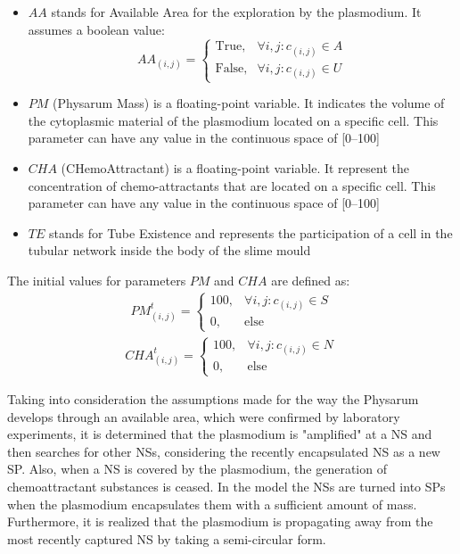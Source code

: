 \begin{itemize}
	\item $AA$ stands for Available Area for the exploration by the plasmodium. It assumes a boolean value:  	
\[AA_{(i, j)}=\begin{cases} \mbox{True}, & \forall i, j: c_{(i,j)} \in A \\ \mbox{False}, &  \forall i, j: c_{(i,j)} \in U\end{cases}\]
	\item $PM$ (Physarum Mass) is a floating-point variable. It indicates the volume of the cytoplasmic material of the plasmodium located on a specific cell. This parameter can have any value in the continuous space of [0–100]
	\item $CHA$ (CHemoAttractant) is a floating-point variable. It represent the concentration of chemo-attractants that are located on a specific cell. This parameter can have any value in the continuous space of [0–100]
	\item $TE$ stands for Tube Existence and represents the participation of a cell in the tubular network inside the body of the slime mould
\end{itemize}

The initial values for parameters $PM$ and $CHA$ are defined as:
\begin{align}
PM^t_{(i, j)}=\begin{cases} 100, & \forall i, j: c_{(i,j)} \in S \\ 0, & \mbox{else}\end{cases}
\end{align}
\begin{align}
CHA^t_{(i, j)}=\begin{cases} 100, & \forall i, j: c_{(i,j)} \in N \\ 0, & \mbox{else}\end{cases}
\end{align}

Taking into consideration the assumptions made for the way the Physarum develops through an available area, which were confirmed by laboratory experiments, it is determined that the plasmodium is "amplified" at a NS and then searches for other NSs, considering the recently encapsulated NS as a new SP. Also, when a NS is covered by the plasmodium, the generation of chemoattractant substances is ceased.
In the model the NSs are turned into SPs when the plasmodium encapsulates them with a sufficient amount of mass. Furthermore, it is realized that the plasmodium is propagating away from the most recently captured NS by taking a semi-circular form. 

